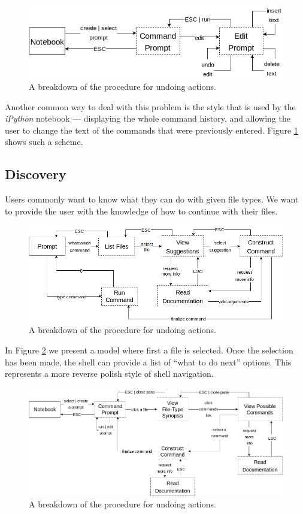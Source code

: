 \begin{figure}[H]
  \centering
  \includegraphics[width=0.8\linewidth]{figures/alternatives/undo_c.png}
  \caption{A breakdown of the procedure for undoing actions.}
  \label{fig:undoc}
\end{figure}

Another common way to deal with this problem is the style that is used by the
\emph{iPython} notebook --- displaying the whole command history, and allowing
the user to change the text of the commands that were previously entered. Figure
\ref{fig:undoc} shows such a scheme.

\subsection{Discovery}

Users commonly want to know what they can do with given file types. We want to
provide the user with the knowledge of how to continue with their files.

\begin{figure}[H]
  \centering
  \includegraphics[width=0.8\linewidth]{figures/alternatives/file_a.png}
  \caption{A breakdown of the procedure for undoing actions.}
  \label{fig:disca}
\end{figure}

In Figure \ref{fig:disca} we present a model where first a file is selected. Once
the selection has been made, the shell can provide a list of ``what to do next''
options. This represents a more reverse polish style of shell navigation.

\begin{figure}[H]
  \centering
  \includegraphics[width=\linewidth]{figures/alternatives/file_b.png}
  \caption{A breakdown of the procedure for undoing actions.}
  \label{fig:discb}
\end{figure}

